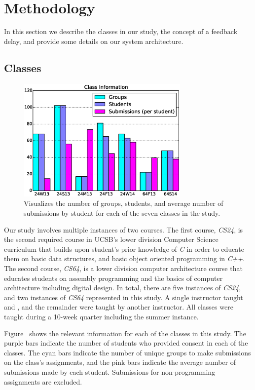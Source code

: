 \section{Methodology} 

In this section we describe the classes in our study, the concept of a feedback
delay, and provide some details on our system architecture.

\subsection{Classes}

\begin{figure}[!t]
\centering \includegraphics[width=3.3in]{graphs/Class_Information.eps}
\caption{Visualizes the number of groups, students, and average number of
  submissions by student for each of the seven classes in the study.}
\end{figure}

Our study involves multiple instances of two courses. The first course,
\emph{CS24}, is the second required course in UCSB's lower division Computer
Science curriculum that builds upon student's prior knowledge of \emph{C} in
order to educate them on basic data structures, and basic object oriented
programming in \emph{C++}. The second course, \emph{CS64}, is a lower division
computer architecture course that educates students on assembly programming and
the basics of computer architecture including digital design. In total, there
are five instances of \emph{CS24}, and two instances of \emph{CS64} represented
in this study. A single instructor taught  and , and the
remainder were taught by another instructor. All classes were taught during a
10-week quarter including the summer instance.

Figure~ shows the relevant information for each of the
classes in this study. The purple bars indicate the number of students who
provided consent in each of the classes. The cyan bars indicate the number of
unique groups to make submissions on the class's assignments, and the pink bars
indicate the average number of submissions made by each student. Submissions
for non-programming assignments are excluded.

